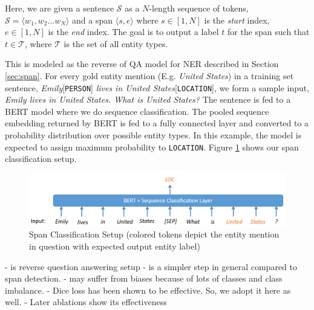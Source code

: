 Here, we are given a sentence $\mathcal{S}$ as a $N$-length sequence of tokens, $\mathcal{S} = \langle w_1, w_2 \ldots w_N \rangle$ and a span $\langle s, e\rangle$ where $s \in [1, N]$ is the \textit{start} index, $e \in [1, N]$ is the \textit{end} index. The goal is to output a label $t$ for the span such that $t \in \mathcal{T}$, where $\mathcal{T}$ is the set of all entity types.

This is modeled as the reverse of QA model for NER described in Section \ref{sec:span}. For every gold entity mention (E.g. \textit{United States}) in a training set sentence, \textit{Emily}[\texttt{PERSON}] \textit{lives in United States}[\texttt{LOCATION}], we form a sample input, \textit{Emily lives in United States. What is United States?} The sentence is fed to a BERT model where we do sequence classification. The pooled sequence embedding returned by BERT is fed to a fully connected layer and converted to a probability distribution over possible entity types. In this example, the model is expected to assign maximum probability to \texttt{LOCATION}. Figure \ref{fig:span_classification} shows our span classification setup.

\begin{figure}[h!]
    \centering
    \includegraphics[width=\linewidth]{resources/span_classification}
    \caption{Span Classification Setup (colored tokens depict the entity mention in question with expected output entity label)}
    \label{fig:span_classification}
\end{figure}

- is reverse question answering setup
- is a simpler step in general compared to span detection. 
- may suffer from biases because of lots of classes and class imbalance. 
- Dice loss has been shown to be effective. So, we adopt it here as well.
- Later ablations show its effectiveness